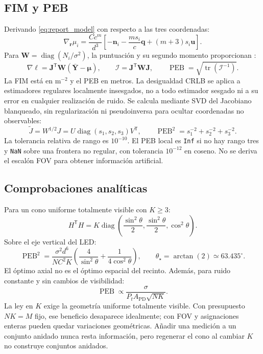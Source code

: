 \documentclass[11pt,a4paper]{article}
\newcommand{\PEB}{\operatorname{PEB}}
\newcommand{\tr}{\operatorname{tr}}
\begin{document}
\subsection{FIM y PEB}
Derivando \eqref{eq:report_model} con respecto a las tres coordenadas:
\begin{equation}
\nabla_{\mathbf r}\mu_i=\frac{Cc^m}{d^3}
\left[-\mathbf n_i-\frac{ms_i}{c}\mathbf q+(m+3)s_i\mathbf u\right].
\end{equation}
Para $\mathbf W=\operatorname{diag}(N_i/\sigma^2)$, la puntuación y su segundo momento proporcionan \cite{kay}:
\begin{equation}
\nabla\ell=\mathbf J^{\mathsf T}\mathbf W(\bar{\mathbf Y}-\bm\mu),\qquad
\mathcal I=\mathbf J^{\mathsf T}\mathbf W\mathbf J,\qquad
\PEB=\sqrt{\tr(\mathcal I^{-1})}.
\label{eq:report_peb}
\end{equation}
La FIM está en $\mathrm m^{-2}$ y el PEB en metros. La desigualdad CRLB se aplica a estimadores regulares localmente insesgados, no a todo estimador sesgado ni a su error en cualquier realización de ruido. Se calcula mediante SVD del Jacobiano blanqueado, sin regularización ni pseudoinversa para ocultar coordenadas no observables:
\begin{equation}
\widetilde J=W^{1/2}J=U\operatorname{diag}(s_1,s_2,s_3)V^{\mathsf T},\qquad
\PEB^2=s_1^{-2}+s_2^{-2}+s_3^{-2}.
\end{equation}
La tolerancia relativa de rango es $10^{-10}$. El PEB local es \texttt{Inf} si no hay rango tres y \texttt{NaN} sobre una frontera no regular, con tolerancia $10^{-12}$ en coseno. No se deriva el escalón FOV para obtener información artificial.

\subsection{Comprobaciones analíticas}
Para un cono uniforme totalmente visible con $K\geq3$:
\begin{equation}
H^{\mathsf T}H=K\operatorname{diag}\left(\frac{\sin^2\theta}{2},\frac{\sin^2\theta}{2},\cos^2\theta\right).
\end{equation}
Sobre el eje vertical del LED:
\begin{equation}
\PEB^2=\frac{\sigma^2d^6}{NC^2K}\left(\frac4{\sin^2\theta}+\frac1{4\cos^2\theta}\right),\qquad
\theta_\star=\arctan(2)\simeq63.435^\circ.
\end{equation}
El óptimo axial no es el óptimo espacial del recinto. Además, para ruido constante y sin cambios de visibilidad:
\begin{equation}
\PEB\propto\frac{\sigma}{P_tA_{\mathrm{PD}}\sqrt{NK}}.
\label{eq:report_scaling}
\end{equation}
La ley en $K$ exige la geometría uniforme totalmente visible. Con presupuesto $NK=M$ fijo, ese beneficio desaparece idealmente; con FOV y asignaciones enteras pueden quedar variaciones geométricas. Añadir una medición a un conjunto anidado nunca resta información, pero regenerar el cono al cambiar $K$ no construye conjuntos anidados.
\end{document}
